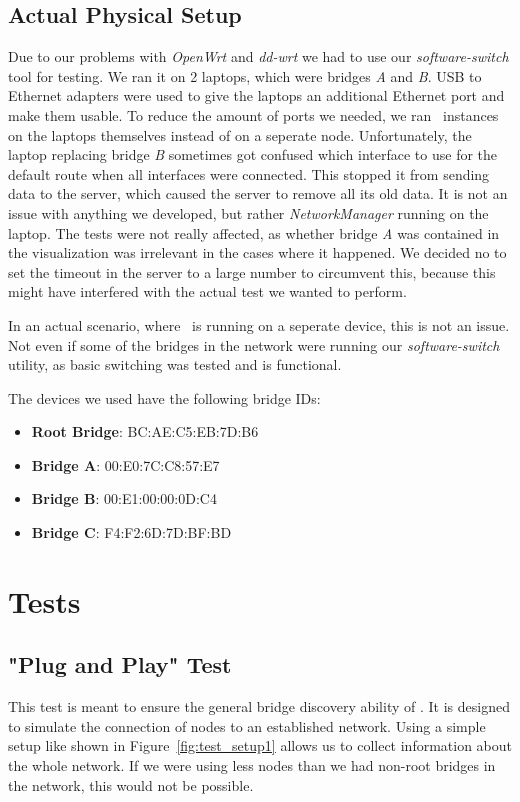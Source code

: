 \subsection*{Actual Physical Setup}
\label{physical_setup}
Due to our problems with \textit{OpenWrt} and \textit{dd-wrt} we had to use our \textit{software-switch} tool for testing.
We ran it on 2 laptops, which were bridges \textit{A} and \textit{B}.
USB to Ethernet adapters were used to give the laptops an additional Ethernet port and make them usable.
To reduce the amount of ports we needed, we ran \tool\ instances on the laptops themselves instead of on a seperate node.
Unfortunately, the laptop replacing bridge \textit{B} sometimes got confused which interface to use for the default route when all interfaces were connected.
This stopped it from sending data to the server, which caused the server to remove all its old data.
It is not an issue with anything we developed, but rather \textit{NetworkManager} running on the laptop.
The tests were not really affected, as whether bridge \textit{A} was contained in the visualization was irrelevant in the cases where it happened.
We decided no to set the timeout in the server to a large number to circumvent this, because this might have interfered with the actual test we wanted to perform.

In an actual scenario, where \tool\ is running on a seperate device, this is not an issue.
Not even if some of the bridges in the network were running our \textit{software-switch} utility, as basic switching was tested and is functional.

The devices we used have the following bridge IDs:
\begin{itemize}
    \item \textbf{Root Bridge}: BC:AE:C5:EB:7D:B6
    \item \textbf{Bridge A}: 00:E0:7C:C8:57:E7
    \item \textbf{Bridge B}: 00:E1:00:00:0D:C4
    \item \textbf{Bridge C}: F4:F2:6D:7D:BF:BD
\end{itemize}

\section{Tests}
\subsection*{"Plug and Play" Test}
\label{usage_test}
This test is meant to ensure the general bridge discovery ability of \tool.
It is designed to simulate the connection of nodes to an established network.
Using a simple setup like shown in Figure~\ref{fig:test_setup1} allows us to collect information about the whole network.
If we were using less nodes than we had non-root bridges in the network, this would not be possible.

